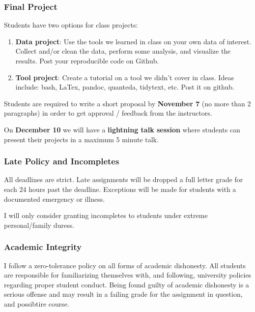 \documentclass[]{book}
\begin{document}
\subsubsection*{Final Project}\label{final-project}

Students have two options for class projects:

\begin{enumerate}
\def\labelenumi{\arabic{enumi}.}
\item
  \textbf{Data project}: Use the tools we learned in class on your own
  data of interest. Collect and/or clean the data, perform some
  analysis, and visualize the results. Post your reproducible code on
  Github.
\item
  \textbf{Tool project}: Create a tutorial on a tool we didn't cover in
  class. Ideas include: bash, LaTex, pandoc, quanteda, tidytext, etc.
  Post it on github.
\end{enumerate}

Students are required to write a short proposal by \textbf{November 7}
(no more than 2 paragraphs) in order to get approval / feedback from the
instructors.

On \textbf{December 10} we will have a \textbf{lightning talk session}
where students can present their projects in a maximum 5 minute talk.

\subsubsection*{Late Policy and
Incompletes}\label{late-policy-and-incompletes}

All deadlines are strict. Late assignments will be dropped a full letter
grade for each 24 hours past the deadline. Exceptions will be made for
students with a documented emergency or illness.

I will only consider granting incompletes to students under extreme
personal/family duress.

\subsubsection*{Academic Integrity}\label{academic-integrity}

I follow a zero-tolerance policy on all forms of academic dishonesty.
All students are responsible for familiarizing themselves with, and
following, university policies regarding proper student conduct. Being
found guilty of academic dishonesty is a serious offense and may result
in a failing grade for the assignment in question, and possibtire
course.
\end{document}
